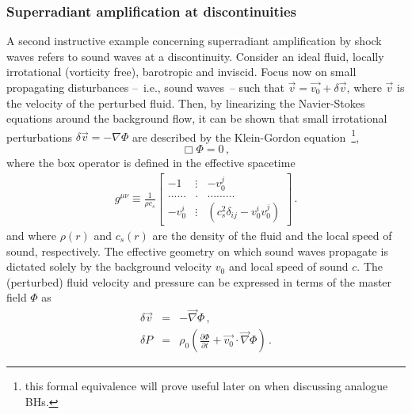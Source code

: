 \documentclass[11pt]{article}
\def\beq{\begin{eqnarray}}
\def\eeq{\end{eqnarray}}
\numberwithin{equation}{section} %
\begin{document}
\subsubsection{Superradiant amplification at discontinuities~\label{super_discontinuity}}
A second instructive example concerning superradiant amplification by shock waves refers to sound waves at a discontinuity.
Consider an ideal fluid, locally irrotational (vorticity free), barotropic and inviscid. Focus now on small propagating disturbances --~i.e., sound waves~-- such that $\vec{v} = \vec{v_0}+\delta \vec{v}$, where $\vec{v}$ is the velocity of the perturbed fluid. Then, by linearizing the Navier-Stokes equations around the background flow,
it can be shown that small irrotational perturbations $\delta \vec{v} = -\nabla \Phi$ are described by the Klein-Gordon equation~\cite{Unruh:1980cg,Visser:1997ux}\footnote{this formal equivalence will prove useful later on when discussing analogue BHs.},
%
\begin{equation}
\Box \Phi = 0\,,
\label{KG}
\end{equation}
%
where the box operator is defined in the effective spacetime 
%
\begin{eqnarray}
g^{\mu \nu}\equiv \frac{1}{\rho c_s} \left[
\begin{array}{ccc}
-1 &\vdots&-v_0^{j}\\
\hdots \hdots &.&\hdots \hdots \hdots\\
-v_0^{i}&\vdots& (c_s^2 \delta _{ij}-v_0^iv_0^j)
\end{array}
\right]\,. \label{metricvisserinv}
\end{eqnarray}
%
and where $\rho(r)$ and $c_s(r)$ are the density of the fluid and the local speed of sound, respectively.
The effective geometry on which sound waves propagate is dictated solely by the background velocity $v_0$
and local speed of sound $c$. The (perturbed) fluid velocity and pressure can be expressed in terms of the master field $\Phi$ as
%
\beq
\delta\vec{v}&=&-\vec{\nabla} \Phi\,,\\
%
\delta P&=&\rho_0\left(\frac{\partial \Phi}{\partial t}+\vec{v_0}\cdot\vec{\nabla} \Phi\right)\,.\label{inversion_sound}
\eeq
%
\end{document}
